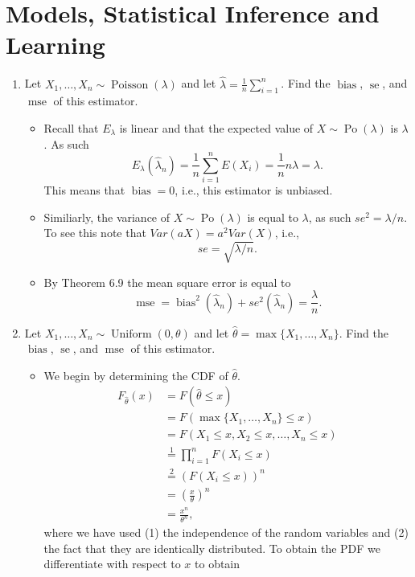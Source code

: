 \documentclass{article}
\newcommand{\mse}{\operatorname{mse}}
\newcommand{\bias}{\operatorname{bias}}
\newcommand{\se}{\operatorname{se}}
\begin{document}
\section{Models, Statistical Inference and Learning}
\begin{enumerate}
	\item Let $X_1, \dots, X_n \sim \operatorname{Poisson}(\lambda)$ and let $\hat{\lambda} = \frac{1}{n} \sum_{i = 1}^n$. Find the $\bias$, $\se$, and $\mse$ of this estimator.
		\begin{itemize}
			\item Recall that $E_\lambda$ is linear and that the expected value of $X \sim \operatorname{Po}(\lambda)$ is $\lambda$. As such
			$$
			E_\lambda(\hat{\lambda}_n) = \frac{1}{n} \sum_{i = 1}^n E(X_i) = \frac{1}{n} n \lambda = \lambda.
			$$
			This means that $\bias = 0$, i.e., this estimator is unbiased.
			\item Similiarly, the variance of $X \sim \operatorname{Po}(\lambda)$ is equal to $\lambda$, as such $se^2 = \lambda / n$. To see this note that $Var(aX) = a^2Var(X)$, i.e.,
			$$
			se = \sqrt{\lambda / n}.
			$$
			\item By Theorem 6.9 the mean square error is equal to
			$$
			\mse = \bias^2(\hat{\lambda}_n) + se^2(\hat{\lambda}_n) = \frac{\lambda}{n}.
			$$
		\end{itemize}
	\item Let $X_1, \dots, X_n \sim \operatorname{Uniform}(0, \theta)$ and let $\hat{\theta} = \max\{X_1, \dots, X_n\}$. Find the $\bias$, $\se$, and $\mse$ of this estimator.
		\begin{itemize}
			\item We begin by determining the CDF of $\hat{\theta}$.
			$$
			\begin{aligned}
			F_{\hat{\theta}}(x) &= F(\hat{\theta} \leq x) \\ 
			&= F(\max\{X_1, \dots, X_n\} \leq x) \\
			&= F(X_1 \leq x, X_2 \leq x, \dots, X_n \leq x) \\
			&\overset{1}{=} \prod_{i = 1}^n F(X_i \leq x) \\
			&\overset{2}{=} (F(X_i \leq x))^n \\
			&= \left( \frac{x}{\theta} \right)^n \\
			&= \frac{x^n}{\theta^n},
			\end{aligned}
			$$
			where we have used (1) the independence of the random variables and (2) the fact that they are identically distributed. To obtain the PDF we differentiate with respect to $x$ to obtain

\end{itemize}
\end{enumerate}
\end{document}
